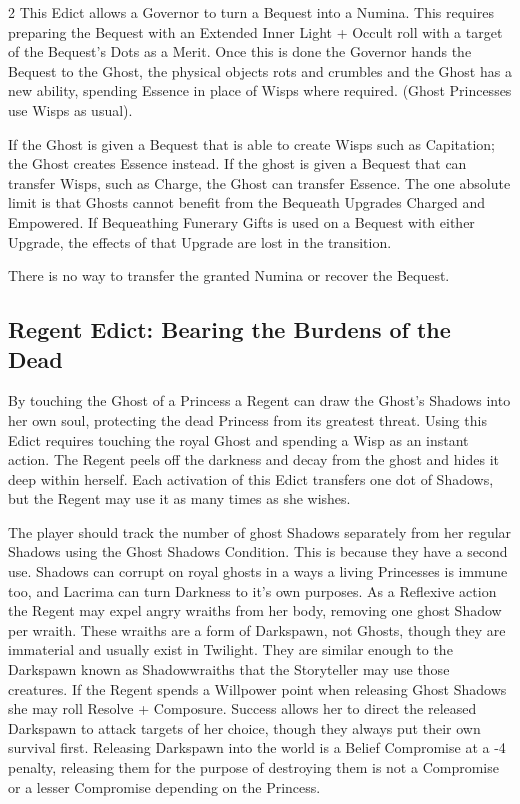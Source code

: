 \begin{multicols}{2}
This Edict allows a Governor to turn a Bequest into a Numina. This requires preparing the Bequest with an Extended Inner Light + Occult roll with a target of the Bequest's Dots as a Merit. Once this is done the Governor hands the Bequest to the Ghost, the physical objects rots and crumbles and the Ghost has a new ability, spending Essence in place of Wisps where required. (Ghost Princesses use Wisps as usual).

If the Ghost is given a Bequest that is able to create Wisps such as Capitation; the Ghost creates Essence instead. If the ghost is given a Bequest that can transfer Wisps, such as Charge, the Ghost can transfer Essence. The one absolute limit is that Ghosts cannot benefit from the Bequeath Upgrades Charged and Empowered. If Bequeathing Funerary Gifts is used on a Bequest with either Upgrade, the effects of that Upgrade are lost in the transition.

There is no way to transfer the granted Numina or recover the Bequest. 
\subsection*{Regent Edict: Bearing the Burdens of the Dead }

By touching the Ghost of a Princess a Regent can draw the Ghost's Shadows into her own soul, protecting the dead Princess from its greatest threat. Using this Edict requires touching the royal Ghost and spending a Wisp as an instant action. The Regent peels off the darkness and decay from the ghost and hides it deep within herself. Each activation of this Edict transfers one dot of Shadows, but the Regent may use it as many times as she wishes.

The player should track the number of ghost Shadows separately from her regular Shadows using the Ghost Shadows Condition. This is because they have a second use. Shadows can corrupt on royal ghosts in a ways a living Princesses is immune too, and Lacrima can turn Darkness to it's own purposes. As a Reflexive action the Regent may expel angry wraiths from her body, removing one ghost Shadow per wraith. These wraiths are a form of Darkspawn, not Ghosts, though they are immaterial and usually exist in Twilight. They are similar enough to the Darkspawn known as Shadowwraiths that the Storyteller may use those creatures. If the Regent spends a Willpower point when releasing Ghost Shadows she may roll Resolve + Composure. Success allows her to direct the released Darkspawn to attack targets of her choice, though they always put their own survival first. Releasing Darkspawn into the world is a Belief Compromise at a -4 penalty, releasing them for the purpose of destroying them is not a Compromise or a lesser 
Compromise depending on the Princess. 


\end{multicols}
